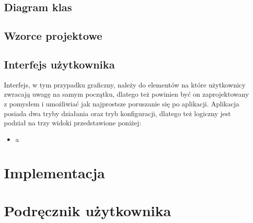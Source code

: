 \documentclass[12pt]{report}
\begin{document}
\subsection{Diagram klas}


\subsection{Wzorce projektowe}


\subsection{Interfejs użytkownika}



Interfejs, w tym przypadku graficzny, należy do elementów na które użytkownicy zwracają uwagę na samym początku, dlatego też powinien być on zaprojektowany z pomysłem i umożliwiać jak najprostsze poruszanie się po aplikacji.
Aplikacja posiada dwa tryby działania oraz tryb konfiguracji, dlatego też logiczny jest podział na trzy widoki przedstawione poniżej:


\begin{itemize}
	\item a
\end{itemize}




\section{Implementacja}


\section{Podręcznik użytkownika}
\end{document}
